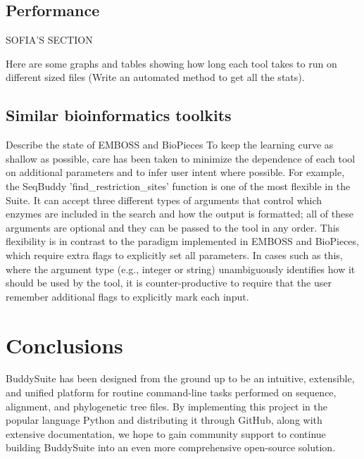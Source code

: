 \documentclass[twocolumn]{bmcart}%
\begin{document}
\subsection*{Performance}
SOFIA'S SECTION

Here are some graphs and tables showing how long each tool takes to run on different sized files (Write an automated method to get all the stats).

\subsection*{Similar bioinformatics toolkits}
Describe the state of EMBOSS and BioPieces
To keep the learning curve as shallow as possible, care has been taken to minimize the dependence of each tool on additional parameters and to infer user intent where possible. For example, the SeqBuddy 'find\_restriction\_sites' function is one of the most flexible in the Suite. It can accept three different types of arguments that control which enzymes are included in the search and how the output is formatted; all of these arguments are optional and they can be passed to the tool in any order. This flexibility is in contrast to the paradigm implemented in EMBOSS and BioPieces, which require extra flags to explicitly set all parameters. In cases such as this, where the argument type (e.g., integer or string) unambiguously identifies how it should be used by the tool, it is counter-productive to require that the user remember additional flags to explicitly mark each input. 


\section*{Conclusions}
BuddySuite has been designed from the ground up to be an intuitive, extensible, and unified platform for routine command-line tasks performed on sequence, alignment, and phylogenetic tree files. By implementing this project in the popular language Python and distributing it through GitHub, along with extensive documentation, we hope to gain community support to continue building BuddySuite into an even more comprehensive open-source solution.

\end{document}
